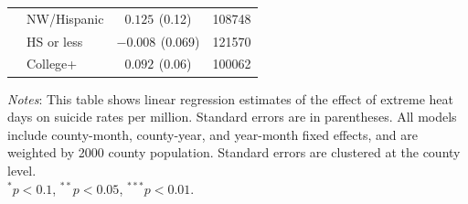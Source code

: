 \documentclass[12pt, a4paper]{article}
\begin{document}
\begin{table}[H]
\begin{tabular}{llcc}
 & NW/Hispanic & $0.125^{}$ (0.12) & 108748 \\
 & HS or less & $-0.008^{}$ (0.069) & 121570 \\
 & College+ & $0.092^{}$ (0.06) & 100062 \\
\bottomrule
\end{tabular}
\vspace{0.5em}
\begin{flushleft}
\footnotesize
\textit{Notes}: This table shows linear regression estimates of the effect of extreme heat days on suicide rates per million. Standard errors are in parentheses. All models include county-month, county-year, and year-month fixed effects, and are weighted by 2000 county population. Standard errors are clustered at the county level.\\
$^{*}p<0.1$, $^{**}p<0.05$, $^{***}p<0.01$.
\end{flushleft}
\end{table}
\end{document}
